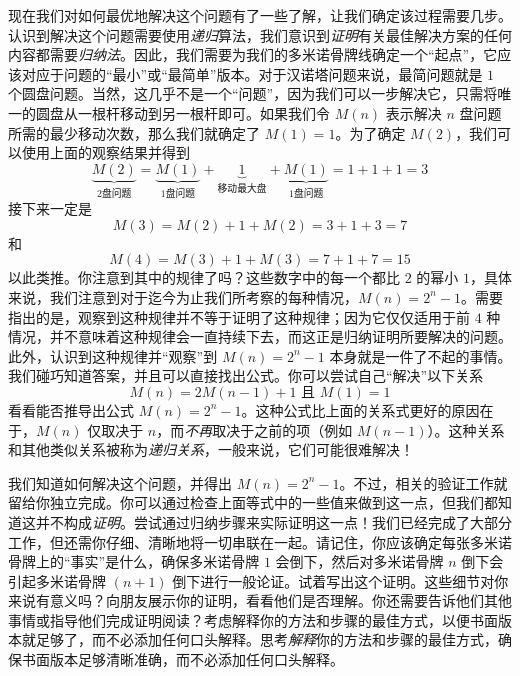 现在我们对如何最优地解决这个问题有了一些了解，让我们确定该过程需要几步。认识到解决这个问题需要使用\emph{递归}算法，我们意识到\emph{证明}有关最佳解决方案的任何内容都需要\emph{归纳法}。因此，我们需要为我们的多米诺骨牌线确定一个``起点''，它应该对应于问题的``最小''或``最简单''版本。对于汉诺塔问题来说，最简问题就是 $1$ 个圆盘问题。当然，这几乎不是一个``问题''，因为我们可以一步解决它，只需将唯一的圆盘从一根杆移动到另一根杆即可。如果我们令 $M(n)$ 表示解决 $n$ 盘问题所需的最少移动次数，那么我们就确定了 $M(1) = 1$。为了确定 $M(2)$，我们可以使用上面的观察结果并得到
\[\underbrace{M(2)}_{2 \text{盘问题}}= \underbrace{M(1)}_{1 \text{盘问题}}+ \underbrace{1}_{\text{移动最大盘}}+ \underbrace{M(1)}_{1 \text{盘问题}}= 1 + 1 + 1 = 3\]
接下来一定是
\[M(3) = M(2) + 1 + M(2) = 3 + 1 + 3 = 7\]
和
\[M(4) = M(3) + 1 + M(3) = 7 + 1 + 7 = 15\]
以此类推。你注意到其中的规律了吗？这些数字中的每一个都比 $2$ 的幂小 $1$，具体来说，我们注意到对于迄今为止我们所考察的每种情况，$M(n) = 2^n - 1$。需要指出的是，观察到这种规律并不等于证明了这种规律；因为它仅仅适用于前 $4$ 种情况，并不意味着这种规律会一直持续下去，而这正是归纳证明所要解决的问题。此外，认识到这种规律并``观察''到 $M(n) = 2^n - 1$ 本身就是一件了不起的事情。我们碰巧知道答案，并且可以直接找出公式。你可以尝试自己``解决''以下关系
\[M(n) = 2M(n - 1) + 1 \text{ 且 } M(1) = 1\]
看看能否推导出公式 $M(n) = 2^n -1$。这种公式比上面的关系式更好的原因在于，$M(n)$ 仅取决于 $n$，而\emph{不再}取决于之前的项（例如 $M(n-1)$）。这种关系和其他类似关系被称为\emph{递归关系}，一般来说，它们可能很难解决！

我们知道如何解决这个问题，并得出 $M(n) = 2^n - 1$。不过，相关的验证工作就留给你独立完成。你可以通过检查上面等式中的一些值来做到这一点，但我们都知道这并不构成\emph{证明}。尝试通过归纳步骤来实际证明这一点！我们已经完成了大部分工作，但还需你仔细、清晰地将一切串联在一起。请记住，你应该确定每张多米诺骨牌上的``事实''是什么，确保多米诺骨牌 $1$ 会倒下，然后对多米诺骨牌 $n$ 倒下会引起多米诺骨牌 $(n+1)$ 倒下进行一般论证。试着写出这个证明。这些细节对你来说有意义吗？向朋友展示你的证明，看看他们是否理解。你还需要告诉他们其他事情或指导他们完成证明阅读？考虑解释你的方法和步骤的最佳方式，以便书面版本就足够了，而不必添加任何口头解释。思考\emph{解释}你的方法和步骤的最佳方式，确保书面版本足够清晰准确，而不必添加任何口头解释。 
